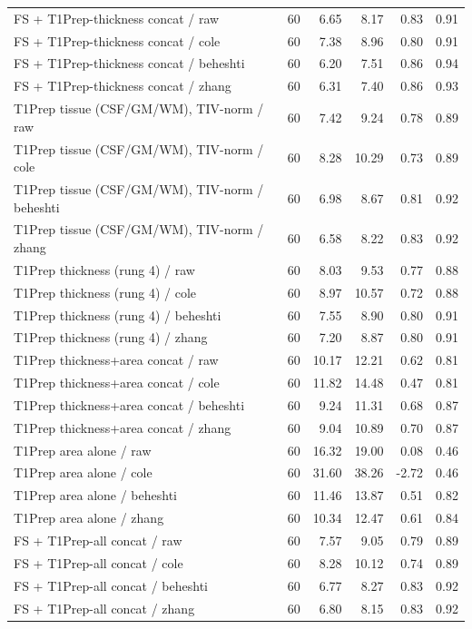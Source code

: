 \documentclass[11pt]{article}
\begin{document}
\begin{center}
\begin{tabular}{lrrrrr}
FS + T1Prep-thickness concat / raw & 60 & 6.65 & 8.17 & 0.83 & 0.91 \\
FS + T1Prep-thickness concat / cole & 60 & 7.38 & 8.96 & 0.80 & 0.91 \\
FS + T1Prep-thickness concat / beheshti & 60 & 6.20 & 7.51 & 0.86 & 0.94 \\
FS + T1Prep-thickness concat / zhang & 60 & 6.31 & 7.40 & 0.86 & 0.93 \\
T1Prep tissue (CSF/GM/WM), TIV-norm / raw & 60 & 7.42 & 9.24 & 0.78 & 0.89 \\
T1Prep tissue (CSF/GM/WM), TIV-norm / cole & 60 & 8.28 & 10.29 & 0.73 & 0.89 \\
T1Prep tissue (CSF/GM/WM), TIV-norm / beheshti & 60 & 6.98 & 8.67 & 0.81 & 0.92 \\
T1Prep tissue (CSF/GM/WM), TIV-norm / zhang & 60 & 6.58 & 8.22 & 0.83 & 0.92 \\
T1Prep thickness (rung 4) / raw & 60 & 8.03 & 9.53 & 0.77 & 0.88 \\
T1Prep thickness (rung 4) / cole & 60 & 8.97 & 10.57 & 0.72 & 0.88 \\
T1Prep thickness (rung 4) / beheshti & 60 & 7.55 & 8.90 & 0.80 & 0.91 \\
T1Prep thickness (rung 4) / zhang & 60 & 7.20 & 8.87 & 0.80 & 0.91 \\
T1Prep thickness+area concat / raw & 60 & 10.17 & 12.21 & 0.62 & 0.81 \\
T1Prep thickness+area concat / cole & 60 & 11.82 & 14.48 & 0.47 & 0.81 \\
T1Prep thickness+area concat / beheshti & 60 & 9.24 & 11.31 & 0.68 & 0.87 \\
T1Prep thickness+area concat / zhang & 60 & 9.04 & 10.89 & 0.70 & 0.87 \\
T1Prep area alone / raw & 60 & 16.32 & 19.00 & 0.08 & 0.46 \\
T1Prep area alone / cole & 60 & 31.60 & 38.26 & -2.72 & 0.46 \\
T1Prep area alone / beheshti & 60 & 11.46 & 13.87 & 0.51 & 0.82 \\
T1Prep area alone / zhang & 60 & 10.34 & 12.47 & 0.61 & 0.84 \\
FS + T1Prep-all concat / raw & 60 & 7.57 & 9.05 & 0.79 & 0.89 \\
FS + T1Prep-all concat / cole & 60 & 8.28 & 10.12 & 0.74 & 0.89 \\
FS + T1Prep-all concat / beheshti & 60 & 6.77 & 8.27 & 0.83 & 0.92 \\
FS + T1Prep-all concat / zhang & 60 & 6.80 & 8.15 & 0.83 & 0.92 \\

\end{tabular}
\end{center}
\end{document}
